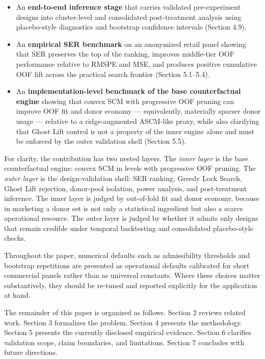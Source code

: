 \documentclass[11pt]{article}
\begin{document}
\begin{itemize}
\item An \textbf{end-to-end inference stage} that carries validated pre-experiment designs into cluster-level and consolidated post-treatment analysis using placebo-style diagnostics and bootstrap confidence intervals (Section 4.9).
\item An \textbf{empirical SER benchmark} on an anonymized retail panel showing that SER preserves the top of the ranking, improves middle-tier OOF performance relative to RMSPE and MSE, and produces positive cumulative OOF lift across the practical search frontier (Section 5.1--5.4).
\item An \textbf{implementation-level benchmark of the base counterfactual engine} showing that convex SCM with progressive OOF pruning can improve OOF fit and donor economy --- equivalently, materially sparser donor usage --- relative to a ridge-augmented ASCM-like proxy, while also clarifying that Ghost Lift control is not a property of the inner engine alone and must be enforced by the outer validation shell (Section 5.5).
\end{itemize}

For clarity, the contribution has two nested layers. The \emph{inner layer} is the base counterfactual engine: convex SCM in levels with progressive OOF pruning. The \emph{outer layer} is the design-validation shell: SER ranking, Greedy Lock Search, Ghost Lift rejection, donor-pool isolation, power analysis, and post-treatment inference. The inner layer is judged by out-of-fold fit and donor economy, because in marketing a donor set is not only a statistical ingredient but also a scarce operational resource. The outer layer is judged by whether it admits only designs that remain credible under temporal backtesting and consolidated placebo-style checks.

Throughout the paper, numerical defaults such as admissibility thresholds and bootstrap repetitions are presented as operational defaults calibrated for short commercial panels rather than as universal constants. Where these choices matter substantively, they should be re-tuned and reported explicitly for the application at hand.

The remainder of this paper is organized as follows. Section 2 reviews related work. Section 3 formalizes the problem. Section 4 presents the methodology. Section 5 presents the currently disclosed empirical evidence. Section 6 clarifies validation scope, claim boundaries, and limitations. Section 7 concludes with future directions.
\end{document}
